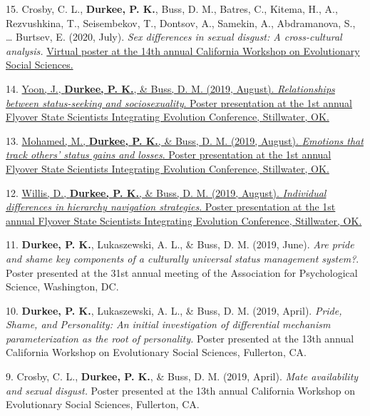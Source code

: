 \documentclass[10pt,]{article}
\begin{document}
15. \hangindent=0.5in Crosby, C. L., \textbf{Durkee, P. K.}, Buss, D.
M., Batres, C., Kitema, H., A., Rezvushkina, T., Seisembekov, T.,
Dontsov, A., Samekin, A., Abdramanova, S., \ldots{} Burtsev, E. (2020,
July). \emph{Sex differences in sexual disgust: A cross-cultural
analysis.}
\href{https://baeab2dc-9ca9-4f07-91d9-ca2bf5c551fa.filesusr.com/ugd/e82d4f_e00c96a9623f40cd95eee2aaad5e59f5.pdf}{Virtual
poster at the 14th annual California Workshop on Evolutionary Social
Sciences.\textsuperscript{\faFilePdfO}}

14. \hangindent=0.5in \href{https://osf.io/uzpj5/}{Yoon,
J.\textsuperscript{\faChevronCircleDown}, \textbf{Durkee, P. K.}, \&
Buss, D. M. (2019, August). \emph{Relationships between status-seeking
and sociosexuality}. Poster presentation at the 1st annual Flyover State
Scientists Integrating Evolution Conference, Stillwater,
OK.\textsuperscript{\faFilePdfO}}

13. \hangindent=0.5in \href{https://osf.io/6jnz5/}{Mohamed,
M.\textsuperscript{\faChevronCircleDown}, \textbf{Durkee, P. K.}, \&
Buss, D. M. (2019, August). \emph{Emotions that track others' status
gains and losses}. Poster presentation at the 1st annual Flyover State
Scientists Integrating Evolution Conference, Stillwater,
OK.\textsuperscript{\faFilePdfO}}

12. \hangindent=0.5in \href{https://osf.io/3rv7z/}{Willis,
D.\textsuperscript{\faChevronCircleDown}, \textbf{Durkee, P. K.}, \&
Buss, D. M. (2019, August). \emph{Individual differences in hierarchy
navigation strategies}. Poster presentation at the 1st annual Flyover
State Scientists Integrating Evolution Conference, Stillwater,
OK.\textsuperscript{\faFilePdfO}}

11. \hangindent=0.5in \textbf{Durkee, P. K.}, Lukaszewski, A. L., \&
Buss, D. M. (2019, June). \emph{Are pride and shame key components of a
culturally universal status management system?}. Poster presented at the
31st annual meeting of the Association for Psychological Science,
Washington, DC.

10. \hangindent=0.5in \textbf{Durkee, P. K.}, Lukaszewski, A. L., \&
Buss, D. M. (2019, April). \emph{Pride, Shame, and Personality: An
initial investigation of differential mechanism parameterization as the
root of personality.} Poster presented at the 13th annual California
Workshop on Evolutionary Social Sciences, Fullerton, CA.

9. \hangindent=0.5in Crosby, C. L., \textbf{Durkee, P. K.}, \& Buss, D.
M. (2019, April). \emph{Mate availability and sexual disgust.} Poster
presented at the 13th annual California Workshop on Evolutionary Social
Sciences, Fullerton, CA.
\end{document}
